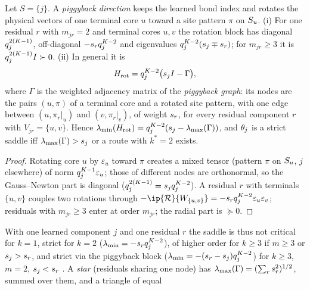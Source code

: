 \begin{proposition}\label{prop:A-piggyback-graph}
  \proven{} 
  Let $S=\{j\}$. A \emph{piggyback direction} keeps the learned bond index and rotates the physical vectors
  of one terminal core $u$ toward a site pattern $\pi$ on $S_{u}$. (i) For one residual $r$ with $m_{jr}=2$
  and terminal cores $u,v$ the rotation block has diagonal $q_j^{2(K-1)}$, off-diagonal $-s_{r}q_j^{K-2}$ and
  eigenvalues $q_j^{K-2}(s_{j}\mp s_{r})$; for $m_{jr}\ge3$ it is $q_j^{2(K-1)}I\succ0$. (ii) In general it is
  \begin{equation}\label{eq:A-piggyback}
    H_{\rm rot}=q_j^{K-2}\big(s_{j}I-\Gamma\big),
  \end{equation}
  where $\Gamma$ is the weighted adjacency matrix of the \emph{piggyback graph}: its nodes are the pairs
  $(u,\pi)$ of a terminal core and a rotated site pattern, with one edge between $(u,\pi_r|_u)$ and
  $(v,\pi_r|_v)$, of weight $s_{r}$, for every residual component $r$ with $V_{jr}=\{u,v\}$. Hence
  $\lambda_{\min}(H_{\rm rot})=q_j^{K-2}(s_{j}-\lambda_{\max}(\Gamma))$, and $\theta_j$ is a strict saddle iff
  $\lambda_{\max}(\Gamma)>s_{j}$ or a route with $k^*=2$ exists.
\end{proposition}
\begin{proof}
  Rotating core $u$ by $\varepsilon_u$ toward $\pi$ creates a mixed tensor (pattern $\pi$ on $S_{u}$, $j$ elsewhere) of norm
  $q_j^{K-1}\varepsilon_u$; those of different nodes are orthonormal, so the Gauss--Newton part is diagonal
  ($q_j^{2(K-1)}=s_{j}q_j^{K-2}$). A residual $r$ with terminals $\{u,v\}$ couples two rotations through
  $-\ip{\mathcal R}{\W_{\{u,v\}}}=-\tw rq_j^{\Kc-2}\varepsilon_u\varepsilon_v$; residuals with $m_{jr}\ge3$ enter at order $m_{jr}$; the radial part is $\succeq0$.
\end{proof}
With one learned component $j$ and one residual $r$ the saddle is thus not critical for $k=1$, strict for
$k=2$ ($\lambda_{\min}=-s_{r}q_j^{K-2}$), of higher order for $k\ge3$ if $m\ge3$ or $s_{j}>s_{r}$, and strict via the
piggyback block ($\lambda_{\min}=-(s_{r}-s_{j})q_j^{K-2}$) for $k\ge3$, $m=2$, $s_{j}<s_{r}$ \proven. A \emph{star}
(residuals sharing one node) has $\lambda_{\max}(\Gamma)=(\sum_rs_{r}^2)^{1/2}$, summed over them, and a triangle of equal
